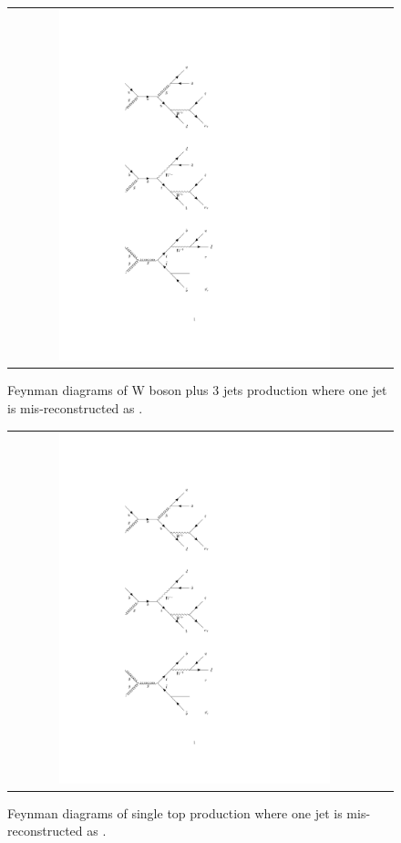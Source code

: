 \begin{figure}[tbh!]
	\centering
	\begin{tabular}{cc}
		\includegraphics[width=0.75\textwidth]{diagrams/pics/background_W3jets.pdf}
	\end{tabular}
	\caption{Feynman diagrams of W boson plus 3 jets production where one jet is mis-reconstructed as \hadtau. }
	\label{fig:background_W3jets}
\end{figure}

\begin{figure}[tbh!]
	\centering
	\begin{tabular}{cc}
		\includegraphics[width=0.75\textwidth]{diagrams/pics/background_singlet.pdf}
	\end{tabular}
	\caption{Feynman diagrams of single top production where one jet is mis-reconstructed as \hadtau. }
	\label{fig:background_singlet}
\end{figure}

\clearpage

